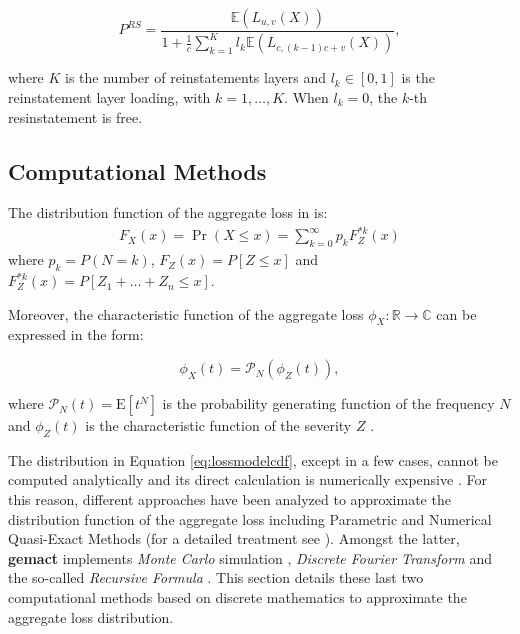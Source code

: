 \documentclass{article}
\begin{document}
\begin{equation}
\label{eq:reinstatementsP}
    P^{RS} =  \frac{\mathbb{E}\left( L_{u, v} (X) \right)}{1+\frac{1}{c} \sum_{k=1}^K l_k \mathbb{E}\left( L_{c, (k-1)c+v}(X) \right)  },
\end{equation}


where $K$ is the number of reinstatements layers and $l_k \in [0, 1]$ is the reinstatement layer loading, with $k=1, \ldots, K$. When $l_k = 0$, the $k$-th resinstatement is free. 
\newline

\subsection{Computational Methods}
\label{sec:computationalmethods}

The distribution function of the aggregate loss in  is:
\begin{align}
\label{eq:lossmodelcdf}
    F_X(x)=\operatorname{Pr}(X \leq x)=\sum_{k=0}^{\infty} p_k F_Z^{* k}(x)
\end{align}
where $p_k=P(N=k)$, $F_Z(x)=P\left[ Z \leq x \right]$ and $F_Z^{* k}(x)=P\left[ Z_1 + \ldots + Z_n \leq x \right]$. 
\newline

Moreover, the characteristic function of the aggregate loss $\phi_{X}: \mathbb{R} \rightarrow \mathbb{C}$ can be expressed in the form:

\begin{equation}\label{eq:aggchar}\phi_{X}(t)=\mathcal{P}_{N}\left(\phi_{Z}(t)\right),\end{equation}

where $\mathcal{P}_{N}(t)=\mathrm{E}\left[t^N\right]$ is the probability generating function of the frequency $N$ and  $\phi_{Z}(t)$ is the characteristic function of the severity $Z$ \cite[p.~153]{klugman98}.
\newline 

The distribution in Equation \ref{eq:lossmodelcdf}, except in a few cases, cannot be computed analytically and its direct calculation is numerically expensive \cite[p.~239]{parodi14}. For this reason, different approaches have been analyzed to approximate the distribution function of the aggregate loss including Parametric and Numerical Quasi-Exact Methods (for a detailed treatment see \cite{Shevchenko:2010}). Amongst the latter, \textbf{gemact} implements \textit{Monte Carlo} simulation \cite[p.~467]{klugman98}, \textit{Discrete Fourier Transform} \cite{heckman83} and the so-called \textit{Recursive Formula} \cite{panjer81}. 
This section details these last two computational methods based on discrete mathematics to approximate the aggregate loss distribution.
\end{document}
